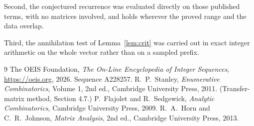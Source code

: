 \documentclass[11pt,a4paper]{article}
\theoremstyle{plain}
\theoremstyle{definition}
\begin{document}
Second, the conjectured recurrence was evaluated directly on those published terms, with no
matrices involved, and holds wherever the proved range and the data overlap.

Third, the annihilation test of Lemma~\ref{lem:crit} was carried out in exact integer
arithmetic on the whole vector rather than on a sampled prefix.

\begin{thebibliography}{9}
 The OEIS Foundation, \emph{The On-Line Encyclopedia of Integer
Sequences}, \url{https://oeis.org}, 2026. Sequence A228257.
 R.~P.~Stanley, \emph{Enumerative Combinatorics}, Volume 1, 2nd ed.,
Cambridge University Press, 2011. (Transfer-matrix method, Section 4.7.)
 P.~Flajolet and R.~Sedgewick, \emph{Analytic Combinatorics}, Cambridge
University Press, 2009.
 R.~A.~Horn and C.~R.~Johnson, \emph{Matrix Analysis}, 2nd ed., Cambridge
University Press, 2013.
\end{thebibliography}
\end{document}
